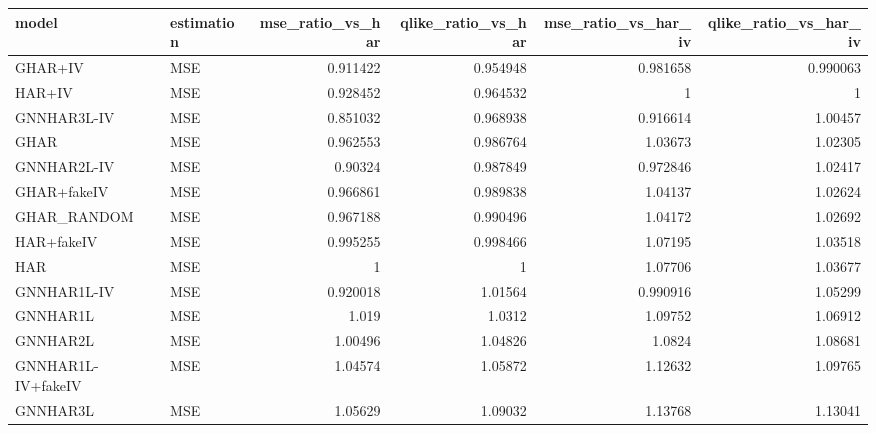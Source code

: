 \begin{tabular}{llrrrr}
\toprule
model & estimation & mse_ratio_vs_har & qlike_ratio_vs_har & mse_ratio_vs_har_iv & qlike_ratio_vs_har_iv \\
\midrule
GHAR+IV & MSE & 0.911422 & 0.954948 & 0.981658 & 0.990063 \\
HAR+IV & MSE & 0.928452 & 0.964532 & 1 & 1 \\
GNNHAR3L-IV & MSE & 0.851032 & 0.968938 & 0.916614 & 1.00457 \\
GHAR & MSE & 0.962553 & 0.986764 & 1.03673 & 1.02305 \\
GNNHAR2L-IV & MSE & 0.90324 & 0.987849 & 0.972846 & 1.02417 \\
GHAR+fakeIV & MSE & 0.966861 & 0.989838 & 1.04137 & 1.02624 \\
GHAR_RANDOM & MSE & 0.967188 & 0.990496 & 1.04172 & 1.02692 \\
HAR+fakeIV & MSE & 0.995255 & 0.998466 & 1.07195 & 1.03518 \\
HAR & MSE & 1 & 1 & 1.07706 & 1.03677 \\
GNNHAR1L-IV & MSE & 0.920018 & 1.01564 & 0.990916 & 1.05299 \\
GNNHAR1L & MSE & 1.019 & 1.0312 & 1.09752 & 1.06912 \\
GNNHAR2L & MSE & 1.00496 & 1.04826 & 1.0824 & 1.08681 \\
GNNHAR1L-IV+fakeIV & MSE & 1.04574 & 1.05872 & 1.12632 & 1.09765 \\
GNNHAR3L & MSE & 1.05629 & 1.09032 & 1.13768 & 1.13041 \\
\bottomrule
\end{tabular}
